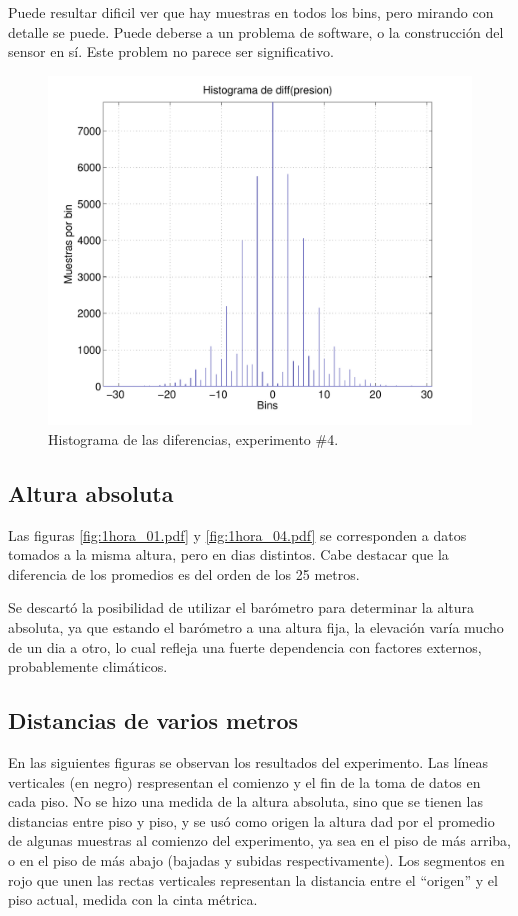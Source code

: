 \documentclass[spanish,12pt,a4paper,titlepage]{report}
\begin{document}
Puede resultar dificil ver que hay muestras en todos los bins, pero mirando con detalle se puede. Puede deberse a un problema de software, o la construcción del sensor en sí. Este problem no parece ser significativo.
\vspace{-14pt}
\begin{figure}[h!]
\centering
  \includegraphics[width=.75\textwidth]{./pics/barom_hist_exp4.pdf}
\vspace{-15pt}
  \caption{Histograma de las diferencias, experimento \#4.}
  \label{fig:barom_hist_exp4.pdf}
\end{figure}
\vspace{-40pt}


\newpage
\subsection{Altura absoluta}

Las figuras \ref{fig:1hora_01.pdf} y \ref{fig:1hora_04.pdf} se corresponden a datos tomados a la misma altura, pero en dias distintos. Cabe destacar que la diferencia de los promedios es del orden de los 25 metros.

Se descartó la posibilidad de utilizar el barómetro para determinar la altura absoluta, ya que estando el barómetro a una altura fija, la elevación varía mucho de un dia a otro, lo cual refleja una fuerte dependencia con factores externos, probablemente climáticos.

\subsection{Distancias de varios metros}

En las siguientes figuras se observan los resultados del experimento. Las líneas verticales (en negro) respresentan el comienzo y el fin de la toma de datos en cada piso. No se hizo una medida de la altura absoluta, sino que se tienen las distancias entre piso y piso, y se usó como origen la altura dad por el promedio de algunas muestras al comienzo del experimento, ya sea en el piso de más arriba, o en el piso de más abajo (bajadas y subidas respectivamente). Los segmentos en rojo que unen las rectas verticales representan la distancia entre el ``origen'' y el piso actual, medida con la cinta métrica.
\end{document}
